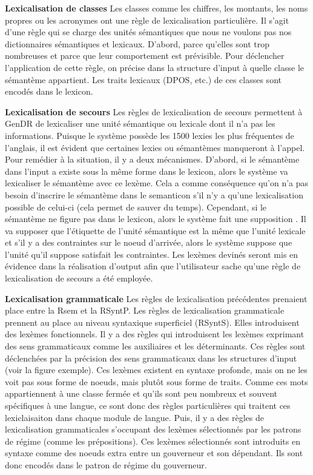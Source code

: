 \textbf{Lexicalisation de classes}
Les classes comme les chiffres, les montants, les noms propres ou les acronymes ont une règle de lexicalisation particulière. Il s'agit d'une règle qui se charge des unités sémantiques que nous ne voulons pas nos dictionnaires sémantiques et lexicaux. D'abord, parce qu'elles sont trop nombreuses et parce que leur comportement est prévisible. Pour déclencher l'application de cette règle, on précise dans la structure d'input à quelle classe le sémantème appartient. Les traits lexicaux (DPOS, etc.) de ces classes sont encodés dans le lexicon.

\textbf{Lexicalisation de secours}\label{secours}
Les règles de lexicalisation de secours permettent à GenDR de lexicaliser une unité sémantique ou lexicale dont il n'a pas les informations. Puisque le système possède les 1500 lexies les plus fréquentes de l'anglais, il est évident que certaines lexies ou sémantèmes manqueront à l'appel. Pour remédier à la situation, il y a deux mécanismes. D'abord, si le sémantème dans l'input a existe sous la même forme dans le lexicon, alors le système va lexicaliser le sémantème avec ce lexème. Cela a comme conséquence qu'on n'a pas besoin d'inscrire le sémantème dans le semanticon s'il n'y a qu'une lexicalisation possible de celui-ci (cela permet de sauver du temps). Cependant, si le sémantème ne figure pas dans le lexicon, alors le système fait une supposition . Il va supposer que l'étiquette de l'unité sémantique est la même que l'unité lexicale et s'il y a des contraintes sur le noeud d'arrivée, alors le système suppose que l'unité qu'il suppose satisfait les contraintes. Les lexèmes devinés seront mis en évidence dans la réalisation d'output afin que l'utilisateur sache qu'une règle de lexicalisation de secours a été employée.
	
\textbf{Lexicalisation grammaticale}
Les règles de lexicalisation précédentes prenaient place entre la Rsem et la RSyntP. Les règles de lexicalisation grammaticale prennent au place au niveau syntaxique superficiel (RSyntS). Elles introduisent des lexèmes fonctionnels. Il y a des règles qui introduisent les lexèmes exprimant des sens grammaticaux comme les auxiliaires et les déterminants. Ces règles sont déclenchées par la précision des sens grammaticaux dans les structures d'input (voir la figure exemple). Ces lexèmes existent en syntaxe profonde, mais on ne les voit pas sous forme de noeuds, mais plutôt sous forme de traits. Comme ces mots appartiennent à une classe fermée et qu'ils sont peu nombreux et souvent spécifiques à une langue, ce sont donc des règles particulières qui traitent ces lexiclaisaiton dans chaque module de langue. Puis, il y a des règles de lexicalisation grammaticales s'occupant des lexèmes sélectionnés par les patrons de régime (comme les prépositions). Ces lexèmes sélectionnés sont introduits en syntaxe comme des noeuds extra entre un gouverneur et son dépendant. Ils sont donc encodés dans le patron de régime du gouverneur.

